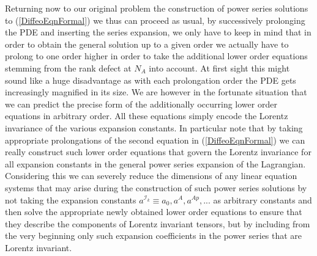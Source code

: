 \documentclass[a4paper,12pt, DIV=14, BCOR=5mm, twoside, headsepline]{scrbook}
\begin{document}
Returning now to our original problem the construction of power series solutions to (\ref{DiffeoEqnFormal}) we thus can proceed as usual, by successively prolonging the PDE and inserting the series expansion, we only have to keep in mind that in order to obtain the general solution up to a given order we actually have to prolong to one order higher in order to take the additional lower order equations stemming from the rank defect at $N_A$ into account.  At first sight this might sound like a huge disadvantage as with each prolongation order the PDE gets increasingly magnified in its size. We are however in the fortunate situation that we can predict the precise form of the additionally occurring lower order equations in arbitrary order. All these equations simply encode the Lorentz invariance of the various expansion constants. In particular note that by taking appropriate prolongations of the second equation in (\ref{DiffeoEqnFormal}) we can really construct such lower order equations that govern the Lorentz invariance for all expansion constants in the general power series expansion of the Lagrangian. 
Considering this we can severely reduce the dimensions of any linear equation systems that may arise during the construction of such power series solutions by not taking the expansion constants $a^{\mathcal{I}_k} \equiv a_0, a^A, a^{Ap},...$ as arbitrary constants and then solve the appropriate newly obtained lower order equations to ensure that they describe the components of Lorentz invariant tensors, but by including from the very beginning only such expansion coefficients in the power series that are Lorentz invariant.\\
\end{document}
